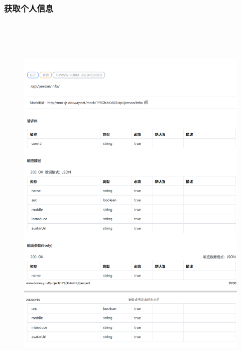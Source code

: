         \subsubsection{获取个人信息}
        \begin{figure}[h]
            \centering
            \includegraphics[height=19.0cm,width=14.0cm]{design/image/api27.png} 
            \end{figure}  
            \newpage
